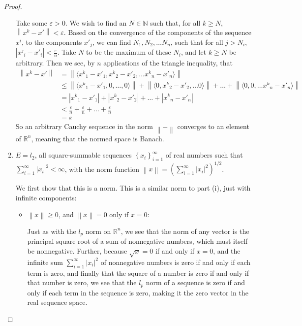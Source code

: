 \documentclass[12pt]{article}
\newcommand{\N}{\mathbb{N}}
\newcommand{\R}{\mathbb{R}}
\theoremstyle{definition}
\begin{document}
\begin{proof}
\begin{enumerate}[label=(\roman*)]
		\par Take some $\varepsilon > 0$. We wish to find an $N \in \N$ such that, for all $k \geq N$, $\left \lVert { x^k - x' } \right \lVert < \varepsilon$. Based on the convergence of the components of the sequence $x^i$, to the components $x'_j$, we can find $N_1, N_2, \dots N_n$, such that for all $j > N_i$, $\left \lvert { {x^j}_i - x'_i } \right \lvert < \frac{\varepsilon}{n}$. Take $N$ to be the maximum of these $N_i$, and let $k\geq N$ be arbitrary. Then we see, by $n$ applications of the triangle inequality, that 
		\begin{align*}
		\left \lVert { x^k - x' } \right \lVert &= \left \lVert { \langle {x^k}_1 - x'_1, {x^k}_2 - x'_2, \dots {x^k}_n - x'_n\rangle } \right \lVert \\
		&\leq \left \lVert { \langle {x^k}_1 - x'_1, 0, \dots, 0\rangle } \right \lVert + \left \lVert { \langle 0, {x^k}_2 - x'_2, \dots 0 \rangle } \right \lVert + \dots + \left \lVert { \langle 0, 0, \dots {x^k}_n - x'_n\rangle } \right \lVert \\
		&= \left \lvert { {x^k}_1 - x'_1 } \right \lvert + \left \lvert { {x^k}_2 - x'_2 } \right \lvert + \dots + \left \lvert { {x^k}_n - x'_n } \right \lvert \\
		&< \frac{\varepsilon}{n} + \frac{\varepsilon}{n} + \dots + \frac{\varepsilon}{n}\\
		&= \varepsilon
		\end{align*}
		So an arbitrary Cauchy sequence in the norm $\left \lVert { - } \right \lVert $ converges to an element of $\R^n$, meaning that the normed space is Banach.
	\item $E = l_2$, all square-summable sequences $\left\{ x_i \right\}_{i=1}^\infty$ of real numbers such that $\sum_{i=1}^\infty \left \lvert { x_i } \right \lvert^2 < \infty$, with the norm function $\left \lVert { x } \right \lVert = \left( \sum_{i=1}^\infty \left \lvert { x_i } \right \lvert ^2\right)^{1/2} $.
		\par We first show that this is a norm. This is a similar norm to part (i), just with infinite components:
		\begin{itemize}
			\item $\left \lVert { x } \right \lVert \geq 0$, and $\left \lVert { x } \right \lVert = 0$ only if $x = 0$:
				\par Just as with the $l_p$ norm on $\R^n$, we see that the norm of any vector is the principal square root of a sum of nonnegative numbers, which must itself be nonnegative. Further, because $\sqrt{x} = 0$ if and only if $x=0$, and the infinite sum $\sum_{i=1}^\infty \left \lvert { x_i } \right \lvert^2$ of nonnegative numbers is zero if and only if each term is zero, and finally that the square of a number is zero if and only if that number is zero, we see that the $l_p$ norm of a sequence is zero if and only if each term in the sequence is zero, making it the zero vector in the real sequence space.

\end{itemize}
\end{enumerate}
\end{proof}
\end{document}
